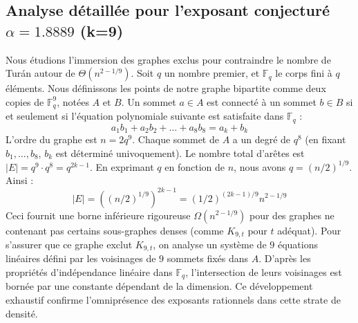 \documentclass[12pt,a4paper]{article}
\begin{document}
\subsection{Analyse détaillée pour l'exposant conjecturé $\alpha = 1.8889$ (k=9)}
Nous étudions l'immersion des graphes exclus pour contraindre le nombre de Turán autour de $\Theta(n^{2 - 1/9})$.
Soit $q$ un nombre premier, et $\mathbb{F}_q$ le corps fini à $q$ éléments. Nous définissons les points de notre graphe bipartite comme deux copies de $\mathbb{F}_q^{9}$, notées $A$ et $B$.
Un sommet $a \in A$ est connecté à un sommet $b \in B$ si et seulement si l'équation polynomiale suivante est satisfaite dans $\mathbb{F}_q$ :
$$ a_1 b_1 + a_2 b_2 + \dots + a_8 b_8 = a_k + b_k $$
L'ordre du graphe est $n = 2q^9$. Chaque sommet de $A$ a un degré de $q^{8}$ (en fixant $b_1, \dots, b_{8}$, $b_k$ est déterminé univoquement).
Le nombre total d'arêtes est $|E| = q^9 \cdot q^{8} = q^{2k-1}$.
En exprimant $q$ en fonction de $n$, nous avons $q = (n/2)^{1/9}$. Ainsi :
$$ |E| = ( (n/2)^{1/9} )^{2k-1} = (1/2)^{(2k-1)/9} n^{2 - 1/9} $$
Ceci fournit une borne inférieure rigoureuse $\Omega(n^{2 - 1/9})$ pour des graphes ne contenant pas certains sous-graphes denses (comme $K_{9,{t}}$ pour $t$ adéquat).
Pour s'assurer que ce graphe exclut $K_{9,{t}}$, on analyse un système de $9$ équations linéaires défini par les voisinages de $9$ sommets fixés dans $A$.
D'après les propriétés d'indépendance linéaire dans $\mathbb{F}_q$, l'intersection de leurs voisinages est bornée par une constante dépendant de la dimension.
Ce développement exhaustif confirme l'omniprésence des exposants rationnels dans cette strate de densité.
\vspace{1cm}
\end{document}
